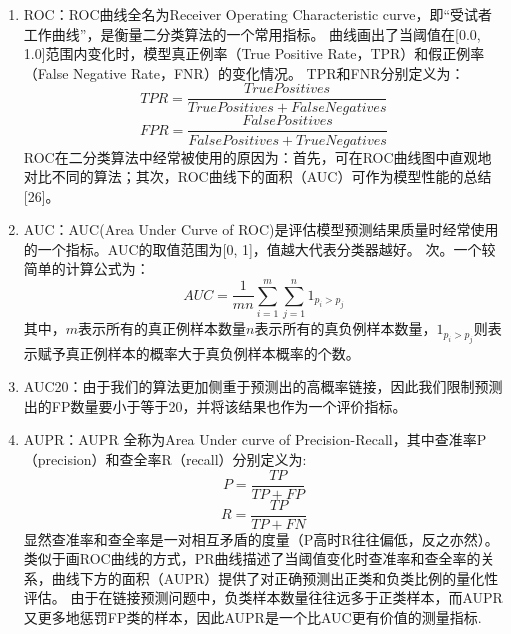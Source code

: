 \begin{enumerate}
    \item ROC：ROC曲线全名为Receiver Operating Characteristic curve，即“受试者工作曲线”，是衡量二分类算法的一个常用指标。
    曲线画出了当阈值在[0.0, 1.0]范围内变化时，模型真正例率（True Positive Rate，TPR）和假正例率（False Negative Rate，FNR）的变化情况。
    TPR和FNR分别定义为：
    \[ TPR = \frac{True Positives}{True Positives + False Negatives} \]
    \[ FPR = \frac{False Positives}{False Positives + True Negatives} \]
    ROC在二分类算法中经常被使用的原因为：首先，可在ROC曲线图中直观地对比不同的算法；其次，ROC曲线下的面积（AUC）可作为模型性能的总结[26]。
    \item AUC：AUC\cite{hanley1982meaning}(Area Under Curve of ROC)是评估模型预测结果质量时经常使用的一个指标。AUC的取值范围为[0, 1]，值越大代表分类器越好。
    次。一个较简单的计算公式为：
    \[AUC=\frac{1}{mn}\sum^m_{i=1}\sum^n_{j=1}1_{p_i>p_j}\]
    其中，$m$表示所有的真正例样本数量$n$表示所有的真负例样本数量，$1_{p_i>p_j}$则表示赋予真正例样本的概率大于真负例样本概率的个数。
    \item AUC20：由于我们的算法更加侧重于预测出的高概率链接，因此我们限制预测出的FP数量要小于等于20，并将该结果也作为一个评价指标。
    \item AUPR：AUPR\cite{davis2006relationship} 全称为Area Under curve of Precision-Recall，其中查准率P（precision）和查全率R（recall）分别定义为:
    \[P=\frac{TP}{TP+FP}\] \[R=\frac{TP}{TP+FN}\]
    显然查准率和查全率是一对相互矛盾的度量（P高时R往往偏低，反之亦然）。
    类似于画ROC曲线的方式，PR曲线描述了当阈值变化时查准率和查全率的关系，曲线下方的面积（AUPR）提供了对正确预测出正类和负类比例的量化性评估\cite{van2011gaussian}。
    由于在链接预测问题中，负类样本数量往往远多于正类样本，而AUPR又更多地惩罚FP类的样本，因此AUPR是一个比AUC更有价值的测量指标\cite{van2011gaussian}.
\end{enumerate}


